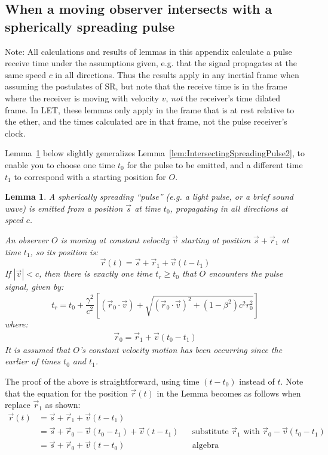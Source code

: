 \documentclass[a4paper]{article}
\theoremstyle{plain}
\newtheorem{lemma}[theorem]{Lemma}
\theoremstyle{definition}
\newcommand{\vect}[1]{\vec{#1}}
\begin{document}
\subsection{When a moving observer intersects with a spherically spreading pulse}
\label{app:IntersectingSpreadingPulse}

Note: All calculations and results of lemmas in this appendix
calculate a pulse receive time under the assumptions given, e.g. that
the signal propagates at the same speed $c$ in all directions.  Thus
the results apply in any inertial frame when assuming the postulates
of SR, but note that the receive time is in the frame where the
receiver is moving with velocity $v$, {\em not} the receiver's time
dilated frame.
In LET, these lemmas only apply in the frame that is at rest relative
to the ether, and the times calculated are in that frame, not the
pulse receiver's clock.

Lemma~\ref{lem:IntersectingSpreadingPulse} below slightly generalizes
Lemma~\ref{lem:IntersectingSpreadingPulse2}, to enable you to choose
one time $t_0$ for the pulse to be emitted, and a different time $t_1$
to correspond with a starting position for $O$.
\begin{lemma}
\label{lem:IntersectingSpreadingPulse}
A spherically spreading ``pulse'' (e.g. a light pulse, or a brief
sound wave) is emitted from a position $\vect{s}$ at time $t_0$,
propagating in all directions at speed $c$.

An observer $O$ is moving at constant velocity $\vect{v}$ starting at
position $\vect{s} + \vect{r}_1$ at time $t_1$, so its position is:
\begin{equation}
\vect{r}(t) = \vect{s} + \vect{r}_1 + \vect{v}(t - t_1)
\end{equation}
If $|\vect{v}| < c$, then there is exactly one time $t_r \geq t_0$
that $O$ encounters the pulse signal, given by:
\begin{equation}
t_r = t_0 + \frac{\gamma^2}{c^2} \left[ (\vect{r}_0 \cdot \vect{v}) + \sqrt{(\vect{r}_0 \cdot \vect{v})^2 + (1-\beta^2)c^2 r_0^2} \right]
\end{equation}
where:
\begin{align*}
\vect{r}_0 = \vect{r}_1 + \vect{v}(t_0-t_1)
\end{align*}
It is assumed that $O$'s constant velocity motion has been occurring
since the earlier of times $t_0$ and $t_1$.
\end{lemma}

The proof of the above is straightforward, using time $(t-t_0)$
instead of $t$.  Note that the equation for the position $\vect{r}(t)$
in the Lemma becomes as follows when replace $\vect{r}_1$ as shown:
\begin{align*}
\vect{r}(t)
  & = \vect{s} + \vect{r}_1 + \vect{v}(t - t_1) \\
  & = \vect{s} + \vect{r}_0 - \vect{v}(t_0-t_1) + \vect{v}(t - t_1) & & \text{substitute $\vect{r}_1$ with $\vect{r}_0 - \vect{v}(t_0-t_1)$} \\
  & = \vect{s} + \vect{r}_0 + \vect{v}(t - t_0) & & \text{algebra}
\end{align*}
\end{document}
